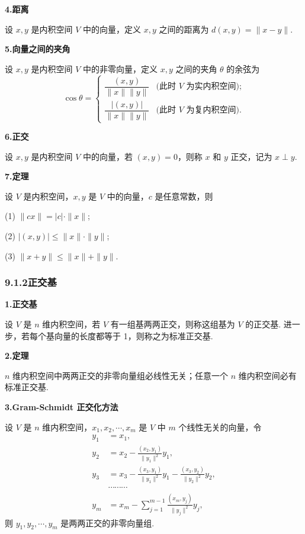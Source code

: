 \documentclass[UTF8, 12pt, fontset=fandol, oneside]{ctexart}
\begin{document}
\noindent\textbf{4.\quad 距离}

设 $x,y$ 是内积空间 $V$ 中的向量，定义 $x,y$ 之间的距离为 $d(x,y)=\|x-y\|$.

\noindent\textbf{5.\quad 向量之间的夹角}

设 $x,y$ 是内积空间 $V$ 中的非零向量，定义 $x,y$ 之间的夹角 $\theta$ 的余弦为
\[
\cos\theta=
\begin{cases}
\dfrac{(x,y)}{\|x\|\|y\|} & \text{(此时 $V$ 为实内积空间);} \\[1.2ex]
\dfrac{|(x,y)|}{\|x\|\|y\|} & \text{(此时 $V$ 为复内积空间).}
\end{cases}
\]

\noindent\textbf{6.\quad 正交}

设 $x,y$ 是内积空间 $V$ 中的向量，若 $(x,y)=0$，则称 $x$ 和 $y$ 正交，记为 $x\perp y$.

\noindent\textbf{7.\quad 定理}

设 $V$ 是内积空间，$x,y$ 是 $V$ 中的向量，$c$ 是任意常数，则

(1) $\|cx\|=|c|\cdot\|x\|$;

(2) $|(x,y)|\le \|x\|\cdot\|y\|$;

(3) $\|x+y\|\le \|x\|+\|y\|$.

\subsubsection*{9.1.2\quad 正交基}

\noindent\textbf{1.\quad 正交基}

设 $V$ 是 $n$ 维内积空间，若 $V$ 有一组基两两正交，则称这组基为 $V$ 的正交基. 进一步，若每个基向量的长度都等于 1，则称之为标准正交基.

\noindent\textbf{2.\quad 定理}

$n$ 维内积空间中两两正交的非零向量组必线性无关；任意一个 $n$ 维内积空间必有标准正交基.

\noindent\textbf{3.\quad Gram-Schmidt 正交化方法}

设 $V$ 是 $n$ 维内积空间，$x_1,x_2,\cdots,x_m$ 是 $V$ 中 $m$ 个线性无关的向量，令
\[
\begin{aligned}
y_1&=x_1,\\
y_2&=x_2-\frac{(x_2,y_1)}{\|y_1\|^2}y_1,\\
y_3&=x_3-\frac{(x_3,y_1)}{\|y_1\|^2}y_1-\frac{(x_3,y_2)}{\|y_2\|^2}y_2,\\
&\cdots\cdots\cdots\\
y_m&=x_m-\sum_{j=1}^{m-1}\frac{(x_m,y_j)}{\|y_j\|^2}y_j,
\end{aligned}
\]
则 $y_1,y_2,\cdots,y_m$ 是两两正交的非零向量组.
\end{document}
